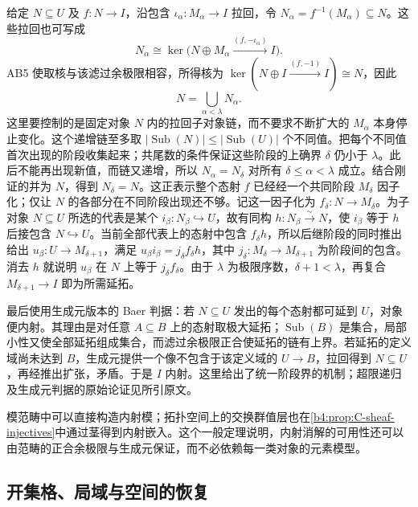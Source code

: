 \begin{proofsketch}
	给定 \(N\subseteq U\) 及 \(f:N\to I\)，沿包含 \(\iota_\alpha:M_\alpha\to I\) 拉回，令 \(N_\alpha=f^{-1}(M_\alpha)\subseteq N\)。这些拉回也可写成
	\[
		N_\alpha\cong\ker\bigl(N\oplus M_\alpha \xrightarrow{(f,-\iota_\alpha)}I\bigr).
	\]
	AB5 使取核与该滤过余极限相容，所得核为 \(\ker(N\oplus I\xrightarrow{(f,-1)}I)\cong N\)，因此
	\[
		N=\bigcup_{\alpha<\lambda}N_\alpha.
	\]
	这里要控制的是固定对象 \(N\) 内的拉回子对象链，而不要求不断扩大的 \(M_\alpha\) 本身停止变化。这个递增链至多取 \(|\operatorname{Sub}(N)|\le|\operatorname{Sub}(U)|\) 个不同值。把每个不同值首次出现的阶段收集起来；共尾数的条件保证这些阶段的上确界 \(\delta\) 仍小于 \(\lambda\)。此后不能再出现新值，而链又递增，所以 \(N_\alpha=N_\delta\) 对所有 \(\delta\le\alpha<\lambda\) 成立。结合刚证的并为 \(N\)，得到 \(N_\delta=N\)。这正表示整个态射 \(f\) 已经经一个共同阶段 \(M_\delta\) 因子化；仅让 \(N\) 的各部分在不同阶段出现还不够。记这一因子化为 \(f_\delta:N\to M_\delta\)。为子对象 \(N\subseteq U\) 所选的代表是某个 \(i_\beta:N_\beta\hookrightarrow U\)，故有同构 \(h:N_\beta\xrightarrow{\sim}N\)，使 \(i_\beta\) 等于 \(h\) 后接包含 \(N\hookrightarrow U\)。当前全部代表上的态射中包含 \(f_\delta h\)，所以后继阶段的同时推出给出 \(u_\beta:U\to M_{\delta+1}\)，满足 \(u_\beta i_\beta=j_\delta f_\delta h\)，其中 \(j_\delta:M_\delta\to M_{\delta+1}\) 为阶段间的包含。消去 \(h\) 就说明 \(u_\beta\) 在 \(N\) 上等于 \(j_\delta f_\delta\)。由于 \(\lambda\) 为极限序数，\(\delta+1<\lambda\)，再复合 \(M_{\delta+1}\to I\) 即为所需延拓。

	最后使用生成元版本的 Baer 判据：若 \(N\subseteq U\) 发出的每个态射都可延到 \(U\)，对象便内射。其理由是对任意 \(A\subseteq B\) 上的态射取极大延拓；\(\operatorname{Sub}(B)\) 是集合，局部小性又使全部延拓组成集合，而滤过余极限正合使延拓的链有上界。若延拓的定义域尚未达到 \(B\)，生成元提供一个像不包含于该定义域的 \(U\to B\)，拉回得到 \(N\subseteq U\)，再经推出扩张，矛盾。于是 \(I\) 内射。这里给出了统一阶段界的机制；超限递归及生成元判据的原始论证见所引原文。
\end{proofsketch}

模范畴中可以直接构造内射模；拓扑空间上的交换群值层也在\cref{b4:prop:C-sheaf-injectives}中通过茎得到内射嵌入。这个一般定理说明，内射消解的可用性还可以由范畴的正合余极限与生成元保证，而不必依赖每一类对象的元素模型。

\subsection{开集格、局域与空间的恢复}
\label{b4:subsec:locale-space-recovery}


